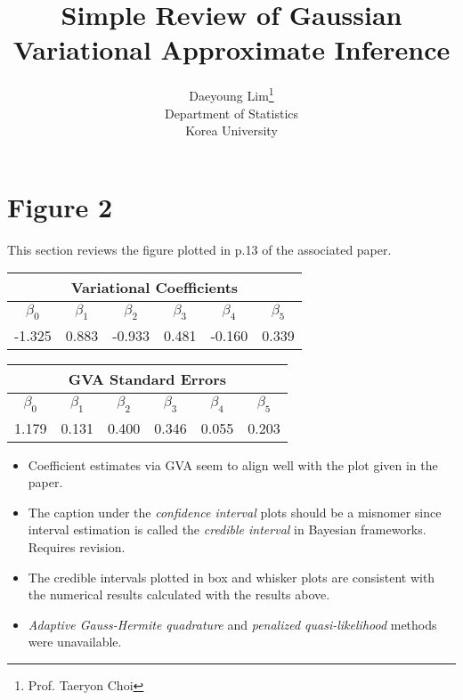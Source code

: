 \documentclass[11pt]{article}
\begin{document}
\nocite{*}

\title{Simple Review of Gaussian Variational Approximate Inference}

\author{Daeyoung Lim\thanks{Prof. Taeryon Choi} \\
Department of Statistics \\
Korea University}

\maketitle


\section{Figure 2}
This section reviews the figure plotted in p.13 of the associated paper.
\begin{table}[!htbp]
\centering
  \begin{tabular}{*6c}
    \toprule
    \multicolumn{6}{c}{\textbf{Variational Coefficients}}\\
    \midrule
    $\beta_{0}$ & $\beta_{1}$ & $\beta_{2}$ & $\beta_{3}$ & $\beta_{4}$ & $\beta_{5}$\\
      -1.325 & 0.883 & -0.933 & 0.481 & -0.160 & 0.339\\
    \bottomrule
  \end{tabular}
\end{table}

\begin{table}[!htbp]
\centering
  \begin{tabular}{*6c}
    \toprule
    \multicolumn{6}{c}{\textbf{GVA Standard Errors}}\\
    \midrule
    $\beta_{0}$ & $\beta_{1}$ & $\beta_{2}$ & $\beta_{3}$ & $\beta_{4}$ & $\beta_{5}$\\
      1.179 & 0.131 & 0.400 & 0.346 & 0.055 & 0.203\\
    \bottomrule
  \end{tabular}
\end{table}
\begin{itemize}
  \item Coefficient estimates via GVA seem to align well with the plot given in the paper.
  \item The caption under the \emph{confidence interval} plots should be a misnomer since interval estimation is called the \emph{credible interval} in Bayesian frameworks. Requires revision.
  \item The credible intervals plotted in box and whisker plots are consistent with the numerical results calculated with the results above.
  \item \emph{Adaptive Gauss-Hermite quadrature} and \emph{penalized quasi-likelihood} methods were unavailable.
\end{itemize}
\end{document}
